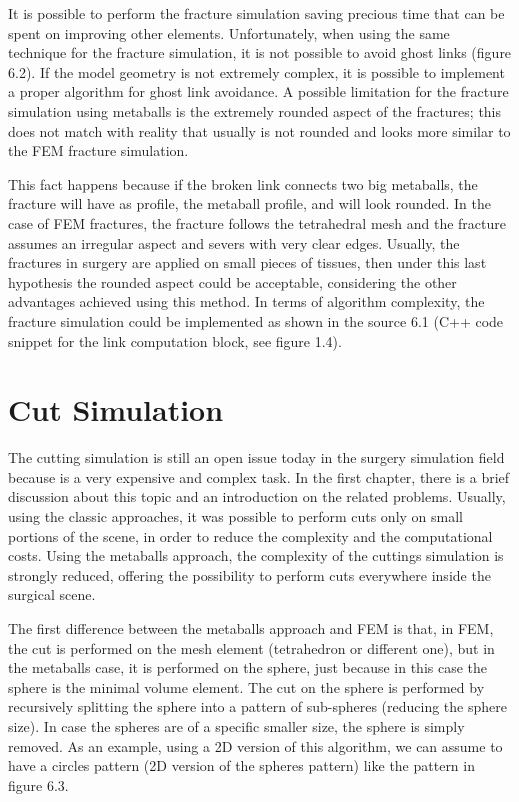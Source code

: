 \documentclass[journal]{vgtc}                %
\begin{document}
It is possible to perform the fracture simulation saving precious time that can be
spent on improving other elements. Unfortunately, when using the same technique
for the fracture simulation, it is not possible to avoid ghost links (figure 6.2). If the
model geometry is not extremely complex, it is possible to implement a proper
algorithm for ghost link avoidance. A possible limitation for the fracture simulation
using metaballs is the extremely rounded aspect of the fractures; this does not match with reality that usually is not rounded and looks more similar to the FEM fracture simulation.

This fact happens because if the broken link connects two big metaballs, the fracture
will have as profile, the metaball profile, and will look rounded. In the case of FEM
fractures, the fracture follows the tetrahedral mesh and the fracture assumes an
irregular aspect and severs with very clear edges. Usually, the fractures in surgery are
applied on small pieces of tissues, then under this last hypothesis the rounded aspect
could be acceptable, considering the other advantages achieved using this method. In
terms of algorithm complexity, the fracture simulation could be implemented as
shown in the source 6.1 (C++ code snippet for the link computation block, see figure
1.4).



\section{Cut Simulation}

The cutting simulation is still an open issue today in the surgery simulation field
because is a very expensive and complex task. In the first chapter, there is a brief
discussion about this topic and an introduction on the related problems. Usually,
using the classic approaches, it was possible to perform cuts only on small portions of the scene, in order to reduce the complexity and the computational costs. Using the metaballs approach, the complexity of the cuttings simulation is strongly reduced, offering the possibility to perform cuts everywhere inside the surgical scene.

The first difference between the metaballs approach and FEM is that, in FEM, the cut
is performed on the mesh element (tetrahedron or different one), but in the metaballs
case, it is performed on the sphere, just because in this case the sphere is the minimal
volume element. The cut on the sphere is performed by recursively splitting the
sphere into a pattern of sub-spheres (reducing the sphere size). In case the spheres are
of a specific smaller size, the sphere is simply removed. As an example, using a 2D
version of this algorithm, we can assume to have a circles pattern (2D version of the
spheres pattern) like the pattern in figure 6.3.
\end{document}
